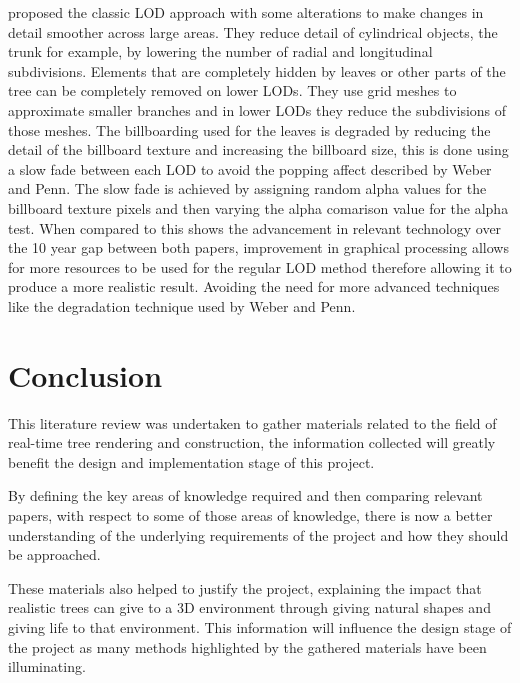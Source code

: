 \documentclass[review]{cmpreport}
\begin{document}
\cite{candussi2005rendering} proposed the classic LOD approach with some alterations to make 
changes in detail smoother across large areas. They reduce detail of cylindrical objects, 
the trunk for example, by lowering the number of radial and longitudinal subdivisions. 
Elements that are completely hidden by leaves or other parts of the tree can be completely 
removed on lower LODs. They use grid meshes to approximate smaller branches and in lower 
LODs they reduce the subdivisions of those meshes. The billboarding used for the leaves is 
degraded by reducing the detail of the billboard texture and increasing the billboard size, 
this is done using a slow fade between each LOD to avoid the popping affect described by 
Weber and Penn. The slow fade is achieved by assigning random alpha values for the billboard 
texture pixels and then varying the alpha comarison value for the alpha test. When compared 
to \cite{weber1995rendering} this shows the advancement in relevant technology over the 10 
year gap between both papers, improvement in graphical processing allows for more resources 
to be used for the regular LOD method therefore allowing it to produce a more realistic result. 
Avoiding the need for more advanced techniques like the degradation technique used by Weber and 
Penn.
\pagebreak

\section{Conclusion}
This literature review was undertaken to gather materials related to the field of real-time 
tree rendering and construction, the information collected will greatly benefit the design 
and implementation stage of this project. \par
By defining the key areas of knowledge required and then comparing relevant papers, with 
respect to some of those areas of knowledge, there is now a better understanding of the 
underlying requirements of the project and how they should be approached. \par 
These materials also helped to justify the project, explaining the impact that realistic 
trees can give to a 3D environment through giving natural shapes and giving life to that 
environment. This information will influence the design stage of the project as many methods 
highlighted by the gathered materials have been illuminating.

\clearpage

\end{document}
